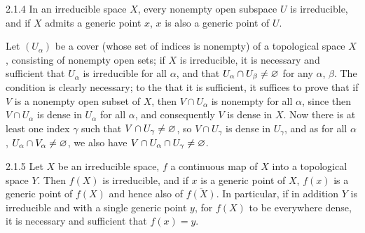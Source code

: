 \documentclass[../main.tex]{subfiles}
\begin{document}
\begin{cx}{2.1.4}
In an irreducible space $X$, every nonempty open subspace $U$ is irreducible, and if $X$
admits a generic point $x$, $x$ is also a generic point of $U$.

Let $(U_\alpha)$ be a cover (whose set of indices is nonempty) of a topological space $X$,
consisting of nonempty open sets; if $X$ is irreducible, it is necessary and sufficient that
$U_\alpha$ is irreducible for all $\alpha$, and that $U_\alpha\cap U_\beta\neq\varnothing$ for any
$\alpha$, $\beta$. The condition is clearly necessary; to the that it is sufficient, it suffices
to prove that if $V$ is a nonempty open subset of $X$, then $V\cap U_\alpha$ is nonempty for all
$\alpha$, since then $V\cap U_\alpha$ is dense in $U_\alpha$ for all $\alpha$, and consequently
$V$ is dense in $X$. Now there is at least one index $\gamma$ such that $V\cap U_\gamma\neq\varnothing$,
so $V\cap U_\gamma$ is dense in $U_\gamma$, and as for all $\alpha$, $U_\alpha\cap V_\alpha\neq\varnothing$,
we also have $V\cap U_\alpha\cap U_\gamma\neq\varnothing$.
\end{cx}

\begin{cx}{2.1.5}
Let $X$ be an irreducible space, $f$ a continuous map of $X$ into a topological space $Y$.
Then $f(X)$ is irreducible, and if $x$ is a generic point of $X$, $f(x)$ is a generic point of
$f(X)$ and hence also of $\overline{f(X)}$. In particular, if in addition $Y$ is irreducible and
with a single generic point $y$, for $f(X)$ to be everywhere dense, it is necessary and sufficient
that $f(x)=y$.
\end{cx}
\end{document}

